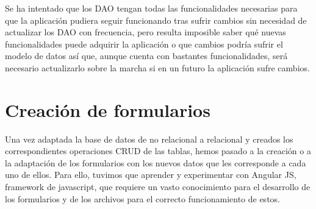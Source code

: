 \documentclass[11pt]{article}
\begin{document}
	Se ha intentado que los DAO tengan todas las funcionalidades necesarias para que la aplicación pudiera seguir funcionando tras sufrir cambios sin necesidad de actualizar los DAO con frecuencia, pero resulta imposible saber qué nuevas funcionalidades puede adquirir la aplicación o que cambios podría sufrir el modelo de datos así que, aunque cuenta con bastantes funcionalidades, será necesario actualizarlo sobre la marcha si en un futuro la aplicación sufre cambios.

\section{Creación de formularios}
Una vez adaptada la base de datos de no relacional a relacional y creados los correspondientes operaciones CRUD de las tablas, hemos pasado a la creación o a la adaptación de los formularios con los nuevos datos que les corresponde a cada uno de ellos. Para ello, tuvimos que aprender y experimentar con Angular JS, framework de javascript, que requiere un vasto conocimiento para el desarrollo de los formularios y de los archivos para el correcto funcionamiento de estos. 
\end{document}
